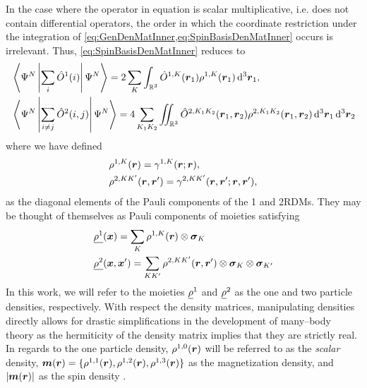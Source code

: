 In the case where the operator in equation is scalar multiplicative, i.e. does not contain differential operators, 
the order in which the coordinate restriction under the integration of \cref{eq:GenDenMatInner,eq:SpinBasisDenMatInner} 
occurs is irrelevant. Thus, \cref{eq:SpinBasisDenMatInner} reduces to \cite{Yang89_book}
\begin{subequations}
\begin{align}
&\left\langle \Psi^N \left\vert \sum_i \hat{O}^1(i) \right\vert \Psi^N \right\rangle = 2 \sum_K \int_{\mathbb R^3}  \hat{O}^{1,K}(\boldsymbol{r}_1) \rho^{1,K}(\boldsymbol{r}_1) 
  \,\mathrm{d}^3\boldsymbol{r}_1,\\
&\left\langle \Psi^N \left\vert \sum_{i\neq j} \hat{O}^2(i,j) \right\vert \Psi^N \right\rangle = 4 \sum_{K_1 K_2} \int\mkern-12mu\int_{\mathbb R^3} 
  \hat{O}^{2,K_1K_2}(\boldsymbol{r}_1,\boldsymbol{r}_2) \rho^{2,K_1 K_2}(\boldsymbol{r}_1,\boldsymbol{r}_2)\,\mathrm{d}^3\boldsymbol{r}_1 \,\mathrm{d}^3\boldsymbol{r}_2
\end{align}
\end{subequations}
where we have defined
\begin{subequations}
  \label{eq:SpinorDensity}
\begin{align}
&\rho^{1,K}(\boldsymbol{r}) = \gamma^{1,K}(\boldsymbol{r};\boldsymbol{r}),\\
&\rho^{2,KK'}(\boldsymbol{r},\boldsymbol{r}') = \gamma^{2,KK'}(\boldsymbol{r},\boldsymbol{r}';\boldsymbol{r},\boldsymbol{r}'),
\end{align}
\end{subequations}
as the diagonal elements of the Pauli components of the 1 and 2RDMs. They may be thought of themselves
as Pauli components of moieties satisfying
\begin{align}
  \label{eq:Densities}
&\underline{\rho^1}(\boldsymbol{x}) = \sum_K \rho^{1,K}(\boldsymbol{r}) \otimes \boldsymbol{\sigma}_{K}\\
&\underline{\rho^2}(\boldsymbol{x},\boldsymbol{x}') = \sum_{KK'} \rho^{2,KK'}(\boldsymbol{r},\boldsymbol{r}') \otimes \boldsymbol{\sigma}_{K}\otimes \boldsymbol{\sigma}_{K'}
\end{align} 
In this work, we will refer to
the moieties $\underline{\rho}^{1}$ and $\underline{\rho}^{2}$ as the  one and two particle
densities, respectively.  With respect the density matrices, manipulating densities directly 
allows for drastic simplifications in the development of many--body theory as the hermiticity
of the density matrix implies that they are strictly real. In regards to the one particle density,
$\rho^{1,0}(\boldsymbol{r})$ will be referred to as the \emph{scalar} density,
$\boldsymbol{m}(\boldsymbol{r}) = \{ \rho^{1,1}(\boldsymbol{r}), \rho^{1,2}(\boldsymbol{r}), \rho^{1,3}(\boldsymbol{r}) \}$ as the magnetization
density, and $\vert \boldsymbol{m}(\boldsymbol{r}) \vert$ as the spin density \cite{Wullen02_779}.





